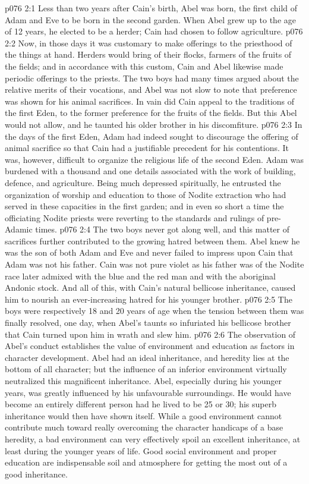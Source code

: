 \vs p076 2:1 Less than two years after Cain’s birth, Abel was born, the first child of Adam and Eve to be born in the second garden. When Abel grew up to the age of 12 years, he elected to be a herder; Cain had chosen to follow agriculture.
\vs p076 2:2 Now, in those days it was customary to make offerings to the priesthood of the things at hand. Herders would bring of their flocks, farmers of the fruits of the fields; and in accordance with this custom, Cain and Abel likewise made periodic offerings to the priests. The two boys had many times argued about the relative merits of their vocations, and Abel was not slow to note that preference was shown for his animal sacrifices. In vain did Cain appeal to the traditions of the first Eden, to the former preference for the fruits of the fields. But this Abel would not allow, and he taunted his older brother in his discomfiture.
\vs p076 2:3 In the days of the first Eden, Adam had indeed sought to discourage the offering of animal sacrifice so that Cain had a justifiable precedent for his contentions. It was, however, difficult to organize the religious life of the second Eden. Adam was burdened with a thousand and one details associated with the work of building, defence, and agriculture. Being much depressed spiritually, he entrusted the organization of worship and education to those of Nodite extraction who had served in these capacities in the first garden; and in even so short a time the officiating Nodite priests were reverting to the standards and rulings of pre\hyp{}Adamic times.
\vs p076 2:4 The two boys never got along well, and this matter of sacrifices further contributed to the growing hatred between them. Abel knew he was the son of both Adam and Eve and never failed to impress upon Cain that Adam was not his father. Cain was not pure violet as his father was of the Nodite race later admixed with the blue and the red man and with the aboriginal Andonic stock. And all of this, with Cain’s natural bellicose inheritance, caused him to nourish an ever\hyp{}increasing hatred for his younger brother.
\vs p076 2:5 The boys were respectively 18 and 20 years of age when the tension between them was finally resolved, one day, when Abel’s taunts so infuriated his bellicose brother that Cain turned upon him in wrath and slew him.
\vs p076 2:6 \pc The observation of Abel’s conduct establishes the value of environment and education as factors in character development. Abel had an ideal inheritance, and heredity lies at the bottom of all character; but the influence of an inferior environment virtually neutralized this magnificent inheritance. Abel, especially during his younger years, was greatly influenced by his unfavourable surroundings. He would have become an entirely different person had he lived to be 25 or 30; his superb inheritance would then have shown itself. While a good environment cannot contribute much toward really overcoming the character handicaps of a base heredity, a bad environment can very effectively spoil an excellent inheritance, at least during the younger years of life. Good social environment and proper education are indispensable soil and atmosphere for getting the most out of a good inheritance.
